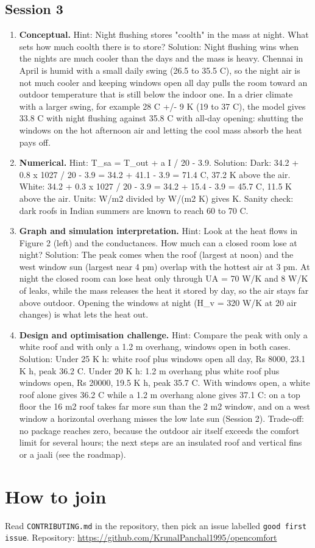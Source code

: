 \documentclass[11pt,a4paper]{article}
\begin{document}
\subsection*{Session 3}
\begin{enumerate}[nosep]
\item \textbf{Conceptual.} Hint: Night flushing stores "coolth" in the mass at night. What sets how much coolth there is to store? Solution: Night flushing wins when the nights are much cooler than the days and the mass is heavy. Chennai in April is humid with a small daily swing (26.5 to 35.5 C), so the night air is not much cooler and keeping windows open all day pulls the room toward an outdoor temperature that is still below the indoor one. In a drier climate with a larger swing, for example 28 C +/- 9 K (19 to 37 C), the model gives 33.8 C with night flushing against 35.8 C with all-day opening: shutting the windows on the hot afternoon air and letting the cool mass absorb the heat pays off.
\item \textbf{Numerical.} Hint: T\_sa = T\_out + a I / 20 - 3.9. Solution: Dark: 34.2 + 0.8 x 1027 / 20 - 3.9 = 34.2 + 41.1 - 3.9 = 71.4 C, 37.2 K above the air. White: 34.2 + 0.3 x 1027 / 20 - 3.9 = 34.2 + 15.4 - 3.9 = 45.7 C, 11.5 K above the air. Units: W/m2 divided by W/(m2 K) gives K. Sanity check: dark roofs in Indian summers are known to reach 60 to 70 C.
\item \textbf{Graph and simulation interpretation.} Hint: Look at the heat flows in Figure 2 (left) and the conductances. How much can a closed room lose at night? Solution: The peak comes when the roof (largest at noon) and the west window sun (largest near 4 pm) overlap with the hottest air at 3 pm. At night the closed room can lose heat only through UA = 70 W/K and 8 W/K of leaks, while the mass releases the heat it stored by day, so the air stays far above outdoor. Opening the windows at night (H\_v = 320 W/K at 20 air changes) is what lets the heat out.
\item \textbf{Design and optimisation challenge.} Hint: Compare the peak with only a white roof and with only a 1.2 m overhang, windows open in both cases. Solution: Under 25 K h: white roof plus windows open all day, Rs 8000, 23.1 K h, peak 36.2 C. Under 20 K h: 1.2 m overhang plus white roof plus windows open, Rs 20000, 19.5 K h, peak 35.7 C. With windows open, a white roof alone gives 36.2 C while a 1.2 m overhang alone gives 37.1 C: on a top floor the 16 m2 roof takes far more sun than the 2 m2 window, and on a west window a horizontal overhang misses the low late sun (Session 2). Trade-off: no package reaches zero, because the outdoor air itself exceeds the comfort limit for several hours; the next steps are an insulated roof and vertical fins or a jaali (see the roadmap).
\end{enumerate}

\section{How to join}
Read \texttt{CONTRIBUTING.md} in the repository, then pick an issue labelled \texttt{good first issue}. Repository: \url{https://github.com/KrunalPanchal1995/opencomfort}
\end{document}
